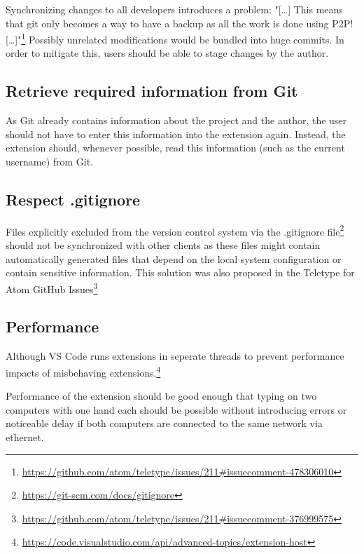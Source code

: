Synchronizing changes to all developers introduces a problem:
"[\dots] This means that git only becomes a way to have a backup as all the work is done using P2P! [\dots]"\footnote{\href{https://github.com/atom/teletype/issues/211\#issuecomment-478306010}{https://github.com/atom/teletype/issues/211\#issuecomment-478306010}}
Possibly unrelated modifications would be bundled into huge commits. In order to mitigate this, users should be able to stage changes by the author.

\subsection{Retrieve required information from Git}

As Git already contains information about the project and the author, the user should not have to enter this information into the extension again. Instead, the extension should, whenever possible, read this information (such as the current username) from Git.

\subsection{Respect .gitignore}

Files explicitly excluded from the version control system via the .gitignore file\footnote{\href{https://git-scm.com/docs/gitignore}{https://git-scm.com/docs/gitignore}} should not be synchronized with other clients as these files might contain automatically generated files that depend on the local system configuration or contain sensitive information. This solution was also proposed in the Teletype for Atom GitHub Issues\footnote{\href{https://github.com/atom/teletype/issues/211\#issuecomment-376999575}{https://github.com/atom/teletype/issues/211\#issuecomment-376999575}}

\subsection{Performance}

Although VS Code runs extensions in seperate threads to prevent performance impacts of misbehaving extensions.\footnote{\href{https://code.visualstudio.com/api/advanced-topics/extension-host}{https://code.visualstudio.com/api/advanced-topics/extension-host}}

Performance of the extension should be good enough that typing on two computers with one hand each should be possible without introducing errors or noticeable delay if both computers are connected to the same network via ethernet.

